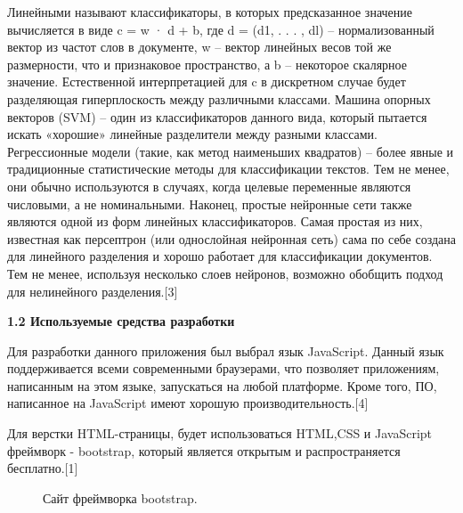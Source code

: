 \documentclass[14pt,a4paper]{extreport}
\begin{document}
    Линейными называют классификаторы, в которых предсказанное значение вычисляется в виде c = w · d + b, где d = (d1, . . . , dl) – нормализованный вектор из частот слов в документе, w – вектор линейных весов той же размерности, что и признаковое пространство, а b – некоторое скалярное значение. Естественной интерпретацией для c в дискретном случае будет разделяющая гиперплоскость между различными классами. Машина опорных векторов (SVM) – один из классификаторов данного вида, который пытается искать «хорошие» линейные разделители между разными классами. Регрессионные модели (такие, как метод наименьших квадратов) – более явные и традиционные статистические методы для классификации текстов. Тем не менее, они обычно используются в случаях, когда целевые переменные являются числовыми, а не номинальными. Наконец, простые нейронные сети также являются одной из форм линейных классификаторов. Самая простая из них, известная как персептрон (или однослойная нейронная сеть) сама по себе создана для линейного разделения и хорошо работает для классификации документов. Тем не менее, используя несколько слоев нейронов, возможно обобщить подход для нелинейного разделения.[3]
\newpage
    \par \small \textbf{1.2 Используемые средства разработки}
    \\ \par Для разработки данного приложения был выбрал язык JavaScript. Данный язык поддерживается всеми современными браузерами, что позволяет приложениям, написанным на этом языке, запускаться на любой платформе. Кроме того, ПО, написанное на JavaScript имеют хорошую производительность.[4]
    \\ \par Для верстки HTML-страницы, будет использоваться HTML,CSS и JavaScript фреймворк - bootstrap, который является открытым и распространяется бесплатно.[1]
    \begin{figure}[h]
    \caption{Сайт фреймворка bootstrap.}
    \label{ris:image}
    \end{figure}
\end{document}
